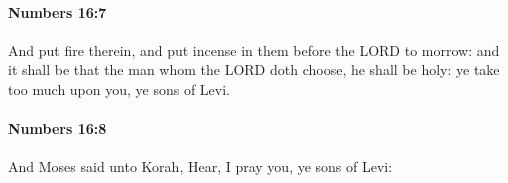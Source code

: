 		\paragraph{Numbers 16:7} %
			\label{NUMBERS-16-7}

			And put fire therein, and put incense in them before the LORD to morrow: and it shall be that the man whom the LORD doth choose, he shall be holy: ye take too much upon you, ye sons of Levi.


		\paragraph{Numbers 16:8} %
			\label{NUMBERS-16-8}

			And Moses said unto Korah, Hear, I pray you, ye sons of Levi:


